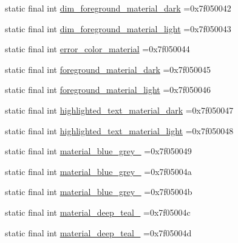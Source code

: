 \begin{DoxyCompactItemize}
\item 
static final int \mbox{\hyperlink{classcom_1_1example_1_1trainawearapplication_1_1_r_1_1color_a3b79c5441543e4a34d29a3d75c68db02}{dim\+\_\+foreground\+\_\+material\+\_\+dark}} =0x7f050042
\item 
static final int \mbox{\hyperlink{classcom_1_1example_1_1trainawearapplication_1_1_r_1_1color_a38a99d095cd02eee10e872847cc5db65}{dim\+\_\+foreground\+\_\+material\+\_\+light}} =0x7f050043
\item 
static final int \mbox{\hyperlink{classcom_1_1example_1_1trainawearapplication_1_1_r_1_1color_a3663d206934633d726d8020fa7ebe70b}{error\+\_\+color\+\_\+material}} =0x7f050044
\item 
static final int \mbox{\hyperlink{classcom_1_1example_1_1trainawearapplication_1_1_r_1_1color_a5e387e780efc075ecc18a5976deb2c34}{foreground\+\_\+material\+\_\+dark}} =0x7f050045
\item 
static final int \mbox{\hyperlink{classcom_1_1example_1_1trainawearapplication_1_1_r_1_1color_acc2731c42b49427a0ebcd24cf8b15729}{foreground\+\_\+material\+\_\+light}} =0x7f050046
\item 
static final int \mbox{\hyperlink{classcom_1_1example_1_1trainawearapplication_1_1_r_1_1color_ae605f6576233d7b89b224860af4d46ad}{highlighted\+\_\+text\+\_\+material\+\_\+dark}} =0x7f050047
\item 
static final int \mbox{\hyperlink{classcom_1_1example_1_1trainawearapplication_1_1_r_1_1color_a225882ea74f440ab882b98702885eeb4}{highlighted\+\_\+text\+\_\+material\+\_\+light}} =0x7f050048
\item 
static final int \mbox{\hyperlink{classcom_1_1example_1_1trainawearapplication_1_1_r_1_1color_aa659d0f6a7e58778e778254c4b3f7f91}{material\+\_\+blue\+\_\+grey\+\_}} =0x7f050049
\item 
static final int \mbox{\hyperlink{classcom_1_1example_1_1trainawearapplication_1_1_r_1_1color_a0c939f212f87c763d84636f86b7bc39e}{material\+\_\+blue\+\_\+grey\+\_}} =0x7f05004a
\item 
static final int \mbox{\hyperlink{classcom_1_1example_1_1trainawearapplication_1_1_r_1_1color_ad714c59ebca6cc5340e6d0f2d86c458a}{material\+\_\+blue\+\_\+grey\+\_}} =0x7f05004b
\item 
static final int \mbox{\hyperlink{classcom_1_1example_1_1trainawearapplication_1_1_r_1_1color_a89965ae38276b29e6f8e5ba83eeb7642}{material\+\_\+deep\+\_\+teal\+\_}} =0x7f05004c
\item 
static final int \mbox{\hyperlink{classcom_1_1example_1_1trainawearapplication_1_1_r_1_1color_ad32b760e4aa45f94057675ddc6cbb1d7}{material\+\_\+deep\+\_\+teal\+\_}} =0x7f05004d

\end{DoxyCompactItemize}

